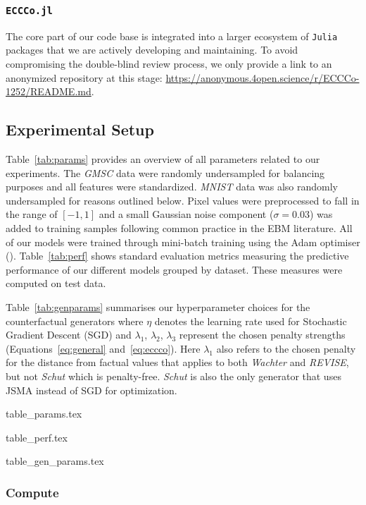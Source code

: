 \documentclass{article}
\begin{document}
\subsubsection{\texttt{ECCCo.jl}}

The core part of our code base is integrated into a larger ecosystem of \texttt{Julia} packages that we are actively developing and maintaining. To avoid compromising the double-blind review process, we only provide a link to an anonymized repository at this stage: \url{https://anonymous.4open.science/r/ECCCo-1252/README.md}. 

\subsection{Experimental Setup}\label{app:setup}

Table~\ref{tab:params} provides an overview of all parameters related to our experiments. The \textit{GMSC} data were randomly undersampled for balancing purposes and all features were standardized. \textit{MNIST} data was also randomly undersampled for reasons outlined below. Pixel values were preprocessed to fall in the range of $[-1,1]$ and a small Gaussian noise component ($\sigma=0.03$) was added to training samples following common practice in the EBM literature. All of our models were trained through mini-batch training using the Adam optimiser (\citet{kingma2017adam}). Table~\ref{tab:perf} shows standard evaluation metrics measuring the predictive performance of our different models grouped by dataset. These measures were computed on test data. 

Table~\ref{tab:genparams} summarises our hyperparameter choices for the counterfactual generators where $\eta$ denotes the learning rate used for Stochastic Gradient Descent (SGD) and $\lambda_1$, $\lambda_2$, $\lambda_3$ represent the chosen penalty strengths (Equations~\ref{eq:general} and~\ref{eq:eccco}). Here $\lambda_1$ also refers to the chosen penalty for the distance from factual values that applies to both \textit{Wachter} and \textit{REVISE}, but not \textit{Schut} which is penalty-free. \textit{Schut} is also the only generator that uses JSMA instead of SGD for optimization.

{table_params.tex}

{table_perf.tex}

{table_gen_params.tex}

\subsubsection{Compute}
\end{document}
